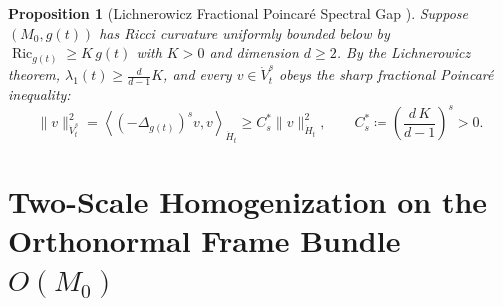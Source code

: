 \documentclass[11pt,a4paper,reqno]{article}
\def\mathcal#1{#1}%
\theoremstyle{plain}
\newtheorem{proposition}[theorem]{Proposition}
\theoremstyle{definition}
\theoremstyle{remark}
\numberwithin{equation}{section}
\begin{document}
\begin{proposition}[Lichnerowicz Fractional Poincar\'e Spectral Gap \cite{lichnerowicz1958geometrie, ananda2026stochastic_fluid_v2}]\label{prop:lichnerowicz_gap}
Suppose $(\mathcal{M}_0, g(t))$ has Ricci curvature uniformly bounded below by $\operatorname{Ric}_{g(t)} \ge K\,g(t)$ with $K > 0$ and dimension $d \ge 2$. By the Lichnerowicz theorem, $\lambda_1(t) \ge \frac{d}{d-1}K$, and every $v \in \dot{V}_t^s$ obeys the sharp fractional Poincar\'e inequality:
\begin{equation}\label{eq:fractional_poincare}
  \|v\|_{\dot{V}_t^s}^2 = \left\langle (-\Delta_{g(t)})^s v, v \right\rangle_{\dot{H}_t} \ge \mathcal{C}_s^* \|v\|_{\dot{H}_t}^2, \qquad \mathcal{C}_s^* \coloneqq \left( \frac{d\,K}{d-1} \right)^s > 0.
\end{equation}
\end{proposition}

\section{Two-Scale Homogenization on the Orthonormal Frame Bundle \texorpdfstring{$O(\mathcal{M}_0)$}{O(M0)}}
\label{sec:frame_bundle}
\end{document}
